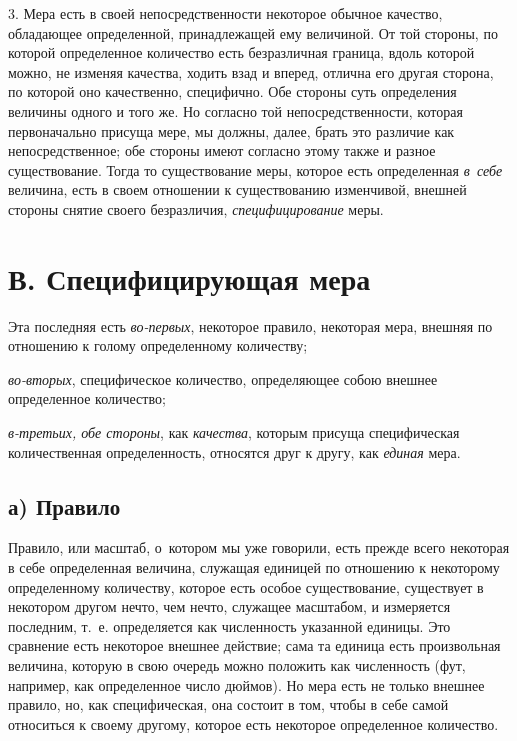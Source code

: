 3. Мера есть в своей непосредственности некоторое обычное качество, обладающее
определенной, принадлежащей ему величиной. От той стороны, по которой
определенное количество есть безразличная граница, вдоль которой можно, не
изменяя качества, ходить взад и вперед, отлична его другая сторона, по которой
оно качественно, специфично. Обе стороны суть определения величины одного и
того же. Но согласно той непосредственности, которая первоначально присуща
мере, мы должны, далее, брать это различие как непосредственное; обе стороны
имеют согласно этому также и разное существование. Тогда то существование меры,
которое есть определенная {\em в~себе} величина, есть в своем отношении к
существованию изменчивой, внешней стороны снятие своего безразличия,
{\em специфицирование} меры.


\section[В. Специфицирующая мера]{В. Специфицирующая мера}

Эта последняя есть {\em во-первых}, некоторое правило, некоторая мера, внешняя
по отношению к голому определенному количеству;

{\em во-вторых}, специфическое количество, определяющее собою внешнее
определенное количество;

{\em в-третьих, обе стороны}, как {\em качества}, которым присуща
специфическая количественная определенность, относятся друг к другу, как
{\em единая} мера.

\subsection[а) Правило]{а) Правило}

Правило, или масштаб, о~котором мы уже говорили, есть прежде всего некоторая в
себе определенная величина, служащая единицей по отношению к некоторому
определенному количеству, которое есть особое существование, существует в
некотором другом нечто, чем нечто, служащее масштабом, и измеряется последним,
т.~е. определяется как численность указанной единицы. Это сравнение есть
некоторое внешнее действие; сама та единица есть произвольная величина, которую
в свою очередь можно положить как численность (фут, например, как определенное
число дюймов). Но мера есть не только внешнее правило, но, как специфическая,
она состоит в том, чтобы в себе самой относиться к своему другому, которое есть
некоторое определенное количество.


